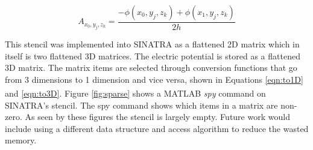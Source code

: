 \begin{equation}
    \label{eqn:neumann}
     A_{x_0,y_j,z_k} = \frac{-\phi(x_0,y_j,z_k) + \phi(x_1,y_j,z_k)}{2 h}
\end{equation}

\indent This stencil was implemented into SINATRA as a flattened 2D matrix which in itself is two flattened 3D matrices. The electric potential is stored as a flattened 3D matrix. The matrix items are selected through conversion functions that go from 3 dimensions to 1 dimension and vice versa, shown in Equations \ref{eqn:to1D} and \ref{eqn:to3D}. Figure \ref{fig:sparse} shows a MATLAB\textsuperscript{\textregistered} \textit{spy} command on SINATRA's stencil. The spy command shows which items in a matrix are non-zero. As seen by these figures the stencil is largely empty. Future work would include using a different data structure and access algorithm to reduce the wasted memory. \par



